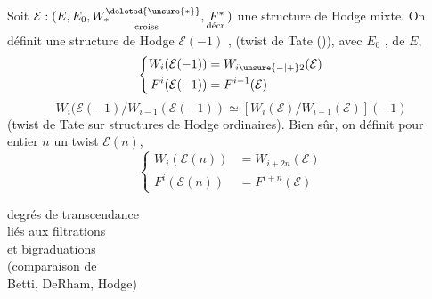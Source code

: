 Soit $\mathcal E:(E,E_0,\underset{\text{croiss}}{W_*^{\deleted{\unsure{*}}}},\underset{\text{décr.}}{F^*})$ une structure de Hodge mixte.
On définit une structure de Hodge $\mathcal E(-1)$ , (twist de Tate ()),  avec  $E_0$ , de  $E$,
\[
\left\{\begin{aligned}
W_i(\mathcal E(-1))&=W_{i\unsure{-|+}2}(\mathcal E)\\
F^i(\mathcal E(-1))&=F^{i-1}(\mathcal E)
\end{aligned}\right.
\]
\[
W_i(\mathcal E(-1)/W_{i-1}(\mathcal E(-1))\simeq[W_i(\mathcal E)/W_{i-1}(\mathcal E)](-1)
\]
(twist de Tate sur structures de Hodge ordinaires).
Bien sûr, on définit pour  entier $n$ un twist $\mathcal E(n)$,
\[
\left\{\begin{aligned}
W_i(\mathcal E(n))&=W_{i+2n}(\mathcal E)\\
F^i(\mathcal E(n))&=F^{i+n}(\mathcal E)
\end{aligned}\right.
\]

degrés de transcendance\\
liés aux filtrations\\
et \uline{bi}graduations\\
(comparaison de\\
Betti, DeRham, Hodge)

